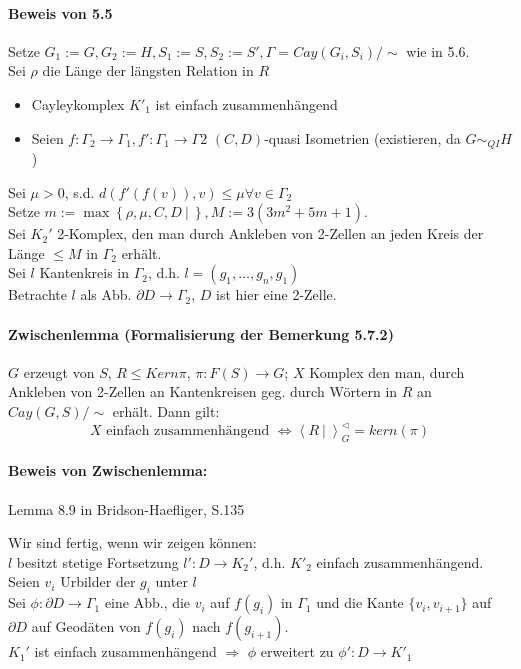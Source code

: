 \documentclass{article}
\newcommand{\set}[2]{\left\lbrace #1~|~#2 \right\rbrace}
\newcommand{\grp}[2]{\left\langle #1~|~#2 \right\rangle}
\begin{document}
\paragraph{Beweis von 5.5}
Setze $G_1 := G, G_2 := H, S_1 := S, S_2 := S', \Gamma = Cay(G_i, S_i)/\sim$ wie in 5.6.\\

Sei $\rho$ die Länge der längsten Relation in $R$
\begin{itemize}
	\item Cayleykomplex $K'_1$ ist einfach zusammenhängend
	\item Seien $f:\Gamma_2 \rightarrow \Gamma_1, f' : \Gamma_1 \rightarrow \Gamma 2$ $(C,D)$-quasi Isometrien (existieren, da $G \sim_{QI} H$)
\end{itemize}
Sei $\mu > 0$, s.d. $d(f'(f(v)), v) \leq \mu \forall v \in \Gamma_2$\\
Setze $m:= \max \set{\rho, \mu, C,D}{}, M := 3(3m^2 + 5m + 1)$.\\
Sei $K_2'$ 2-Komplex, den man durch Ankleben von 2-Zellen an jeden Kreis der Länge $\leq M$ in $\Gamma_2$ erhält.\\

Sei $l$ Kantenkreis in $\Gamma_2$, d.h. $l = (g_1,\ldots, g_n, g_1)$\\
Betrachte $l$ als Abb. $\partial D \rightarrow \Gamma_2$, $D$ ist hier eine 2-Zelle.\\

\paragraph{Zwischenlemma (Formalisierung der Bemerkung 5.7.2)}
$G$ erzeugt von $S$, $R \leq Kern \pi$, $\pi : F(S) \rightarrow G$; $X$ Komplex den man, durch Ankleben von 2-Zellen an Kantenkreisen geg. durch Wörtern in $R$ an $Cay(G,S)/\sim$ erhält. Dann gilt:
\[X \text{ einfach zusammenhängend } \Longleftrightarrow \grp{R}{}_G^\vartriangleleft = kern(\pi)  \]
\paragraph{Beweis von Zwischenlemma:} Lemma 8.9 in Bridson-Haefliger, S.135


Wir sind fertig, wenn wir zeigen können:\\
$l$ besitzt stetige Fortsetzung $l' : D \rightarrow K_2'$, d.h. $K'_2$ einfach zusammenhängend.\\
Seien $v_i$ Urbilder der $g_i$ unter $l$\\
Sei $\phi : \partial D \rightarrow \Gamma_1$ eine Abb., die $v_i$ auf $f(g_i)$ in $\Gamma_1$ und die Kante $\{v_i, v_{i+1}\}$ auf $\partial D$ auf Geodäten von $f(g_i)$ nach $f(g_{i+1})$.\\
$K_1'$ ist einfach zusammenhängend $\Longrightarrow$ $\phi$ erweitert zu $\phi': D \rightarrow K'_1$
\end{document}
